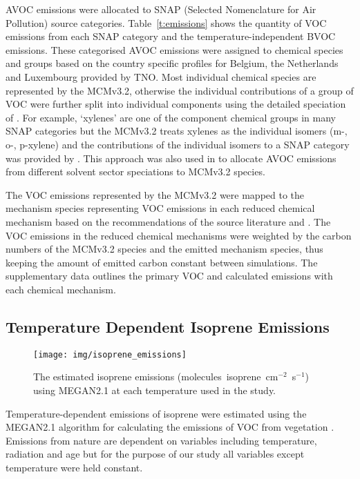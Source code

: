 AVOC emissions were allocated to SNAP (Selected Nomenclature for Air Pollution) source categories.
Table~\ref{t:emissions} shows the quantity of VOC emissions from each SNAP category and the temperature-independent BVOC emissions.
These categorised AVOC emissions were assigned to chemical species and groups based on the country specific profiles for Belgium, the Netherlands and Luxembourg provided by TNO.
Most individual chemical species are represented by the MCMv3.2, otherwise the individual contributions of a group of VOC were further split into individual components using the detailed speciation of \citet{Passant:2002}.
For example, `xylenes' are one of the component chemical groups in many SNAP categories but the MCMv3.2 treats xylenes as the individual isomers (m-, o-, p-xylene) and the contributions of the individual isomers to a SNAP category was provided by \citet{Passant:2002}.
This approach was also used in \citet{vonSchneidemesser:2015} to allocate AVOC emissions from different solvent sector speciations to MCMv3.2 species.

The VOC emissions represented by the MCMv3.2 were mapped to the mechanism species representing VOC emissions in each reduced chemical mechanism based on the recommendations of the source literature and \citet{Carter:2015}.
The VOC emissions in the reduced chemical mechanisms were weighted by the carbon numbers of the MCMv3.2 species and the emitted mechanism species, thus keeping the amount of emitted carbon constant between simulations. 
The supplementary data outlines the primary VOC and calculated emissions with each chemical mechanism.

\subsection{Temperature Dependent Isoprene Emissions} \label{ss:megan}
\begin{figure}[t]%
    \centering%
    \caption{The estimated isoprene emissions (molecules~isoprene~cm$^{-2}$~s$^{-1}$) using MEGAN2.1 at each temperature used in the study.}
    \label{f:isoprene_emissions}%
    \texttt{[image: img/isoprene\_emissions]}
\end{figure}
Temperature-dependent emissions of isoprene were estimated using the MEGAN2.1 algorithm for calculating the emissions of VOC from vegetation \citep{Guenther:2012}.
Emissions from nature are dependent on variables including temperature, radiation and age but for the purpose of our study all variables except temperature were held constant.

